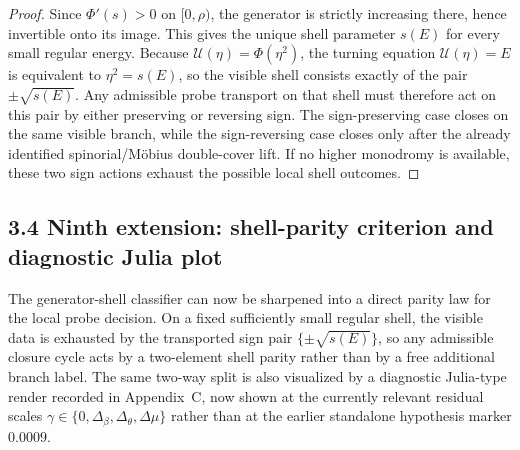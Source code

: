 \documentclass[12pt,a4paper]{article}
\begin{document}
\begin{proof}
Since $\Phi'(s)>0$ on $[0,\rho)$, the generator is strictly increasing there, hence invertible onto its image. This gives the unique shell parameter $s(E)$ for every small regular energy. Because $\mathcal U(\eta)=\Phi(\eta^2)$, the turning equation $\mathcal U(\eta)=E$ is equivalent to $\eta^2=s(E)$, so the visible shell consists exactly of the pair $\pm\sqrt{s(E)}$. Any admissible probe transport on that shell must therefore act on this pair by either preserving or reversing sign. The sign-preserving case closes on the same visible branch, while the sign-reversing case closes only after the already identified spinorial/M\"obius double-cover lift. If no higher monodromy is available, these two sign actions exhaust the possible local shell outcomes.
\end{proof}



\subsection*{3.4 Ninth extension: shell-parity criterion and diagnostic Julia plot}
The generator-shell classifier can now be sharpened into a direct parity law for the local probe decision. On a fixed sufficiently small regular shell, the visible data is exhausted by the transported sign pair $\{\pm\sqrt{s(E)}\}$, so any admissible closure cycle acts by a two-element shell parity rather than by a free additional branch label. The same two-way split is also visualized by a diagnostic Julia-type render recorded in Appendix~C, now shown at the currently relevant residual scales $\gamma\in\{0,\Delta_\beta,\Delta_\theta,\Delta\mu\}$ rather than at the earlier standalone hypothesis marker $0.0009$.
\end{document}
